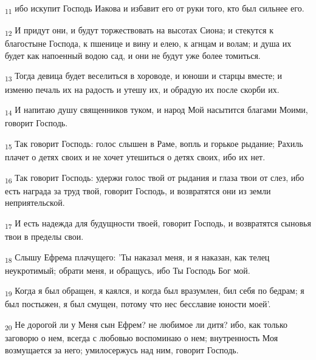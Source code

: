 \begin{tcolorbox}
\textsubscript{11} ибо искупит Господь Иакова и избавит его от руки того, кто был сильнее его.
\end{tcolorbox}
\begin{tcolorbox}
\textsubscript{12} И придут они, и будут торжествовать на высотах Сиона; и стекутся к благостыне Господа, к пшенице и вину и елею, к агнцам и волам; и душа их будет как напоенный водою сад, и они не будут уже более томиться.
\end{tcolorbox}
\begin{tcolorbox}
\textsubscript{13} Тогда девица будет веселиться в хороводе, и юноши и старцы вместе; и изменю печаль их на радость и утешу их, и обрадую их после скорби их.
\end{tcolorbox}
\begin{tcolorbox}
\textsubscript{14} И напитаю душу священников туком, и народ Мой насытится благами Моими, говорит Господь.
\end{tcolorbox}
\begin{tcolorbox}
\textsubscript{15} Так говорит Господь: голос слышен в Раме, вопль и горькое рыдание; Рахиль плачет о детях своих и не хочет утешиться о детях своих, ибо их нет.
\end{tcolorbox}
\begin{tcolorbox}
\textsubscript{16} Так говорит Господь: удержи голос твой от рыдания и глаза твои от слез, ибо есть награда за труд твой, говорит Господь, и возвратятся они из земли неприятельской.
\end{tcolorbox}
\begin{tcolorbox}
\textsubscript{17} И есть надежда для будущности твоей, говорит Господь, и возвратятся сыновья твои в пределы свои.
\end{tcolorbox}
\begin{tcolorbox}
\textsubscript{18} Слышу Ефрема плачущего: 'Ты наказал меня, и я наказан, как телец неукротимый; обрати меня, и обращусь, ибо Ты Господь Бог мой.
\end{tcolorbox}
\begin{tcolorbox}
\textsubscript{19} Когда я был обращен, я каялся, и когда был вразумлен, бил себя по бедрам; я был постыжен, я был смущен, потому что нес бесславие юности моей'.
\end{tcolorbox}
\begin{tcolorbox}
\textsubscript{20} Не дорогой ли у Меня сын Ефрем? не любимое ли дитя? ибо, как только заговорю о нем, всегда с любовью воспоминаю о нем; внутренность Моя возмущается за него; умилосержусь над ним, говорит Господь.
\end{tcolorbox}
